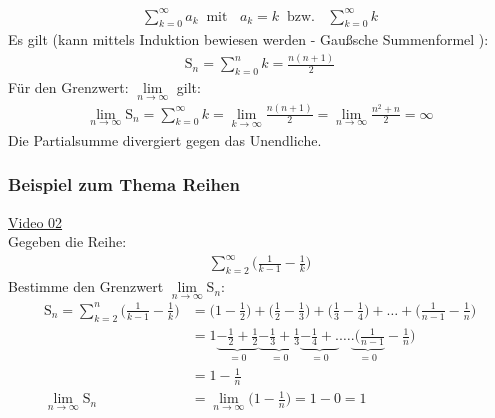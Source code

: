 \begin{align*}
\sum\limits_{k=0}^{\infty}a_k\;\;\text{mit }\;\;a_k=k\;\;\text{bzw. }\;\;\sum\limits_{k=0}^{\infty}k
\end{align*}
Es gilt (kann mittels Induktion bewiesen werden - Gaußsche Summenformel ):\\
\begin{align*}
\mathrm{S}_n=\sum\limits_{k=0}^{n}k=\frac{n(n+1)}{2}
\end{align*}
Für den Grenzwert: $ \lim\limits_ {n\to\infty} $ gilt:\\
\begin{align*}
\lim\limits_ {n\to\infty}\mathrm{S}_n=\sum\limits_{k=0}^{\infty}k=\lim\limits_ {k\to\infty}\frac{n(n+1)}{2}=\lim\limits_ {n\to\infty}\frac{n^2+n}{2}=\infty
\end{align*}
Die Partialsumme divergiert gegen das Unendliche.\\
\newpage
\noindent
\subsubsection{Beispiel zum Thema Reihen}
\href{https://youtu.be/hroOOlHucwM}{Video 02}\\
Gegeben die Reihe:\\
\begin{align*}
\sum\limits_{k=2}^{\infty}\bigg(\frac{1}{k-1}-\frac{1}{k}\bigg)
\end{align*}
Bestimme den Grenzwert $\lim\limits_ {n\to\infty} \mathrm{S}_n $:
\begin{align*}
\mathrm{S}_n=\sum\limits_{k=2}^{n}\bigg(\frac{1}{k-1}-\frac{1}{k}\bigg)&=\bigg(1-\frac{1}{2}\bigg)+\bigg(\frac{1}{2}-\frac{1}{3}\bigg)+\bigg(\frac{1}{3}-\frac{1}{4}\bigg)+\ldots+\bigg(\frac{1}{n-1}-\frac{1}{n}\bigg)\\
&=1\underbrace {-\frac{1}{2}+\frac{1}{2}}_{=0}\underbrace {-\frac{1}{3}+\frac{1}{3}}_{=0}\underbrace {-\frac{1}{4}+.}_{=0}\ldots\underbrace {.\bigg(\frac{1}{n-1}}_{=0}-\frac{1}{n}\bigg)\\
&=1-\frac{1}{n}\\
\lim\limits_ {n\to\infty}\mathrm{S}_n&=\lim\limits_ {n\to\infty}\bigg(1-\frac{1}{n}\bigg)=1-0=1\\
\end{align*}
